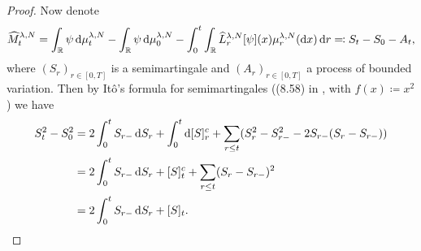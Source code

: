 \documentclass{article}
\begin{document}
\begin{proof}
  Now denote
  \begin{equation}\label{eq:M=S-A}
    \widehat{M}_t^{\lambda,N} = \int_\potspace \psi \odif{\mu_t^{\lambda, N}} - \int_\potspace \psi \odif{\mu_0^{\lambda, N}} - \int_0^t \int_\potspace \widehat{L}_r^{\lambda, N} [\psi](x) \mu_{r}^{\lambda, N}(\odif{x}) \odif{r}
    \eqqcolon S_t - S_0 - A_t,
  \end{equation}
  where $(S_r)_{r\in[0,T]}$ is a semimartingale and $(A_r)_{r\in[0,T]}$ a process of bounded variation.
  Then by Itô's formula for semimartingales ((8.58) in \cite[236]{klebanerIntroductionStochasticCalculus2012}, with $f(x) \coloneqq x^2$) we have
  \begin{equation}\label{eq:S^2-q-var-rel}
    \begin{split}
      S_t^2 - S_0^2
       & = 2 \int_0^t S_{r-} \odif{S_r} + \int_0^t \odif{\sbr{S}_r^c}
      + \sum_{r \leq t} \br{ S_r^2 - S_{r-}^2  - 2 S_{r-} (S_r - S_{r-}) } \\
       & = 2 \int_0^t S_{r-} \odif{S_r} + \sbr{S}_t^c
      + \sum_{r \leq t} \br{ S_r - S_{r-} }^2                              \\
       & = 2 \int_0^t S_{r-} \odif{S_r} + \sbr{S}_t.
    \end{split}
  \end{equation}


\end{proof}
\end{document}
